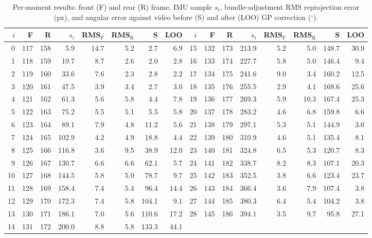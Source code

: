 \documentclass[11pt,a4paper]{article}
\newcommand{\dg}{^{\circ}}
\begin{document}
\begin{table}[H]\centering\footnotesize
\caption{Per-moment results: front (F) and rear (R) frame, IMU sample $s_i$, bundle-adjustment RMS
reprojection error (px), and angular error against video before (S) and after (LOO) GP
correction ($\dg$).}\label{tab:moments}
\setlength{\tabcolsep}{3.5pt}
\begin{tabular}{@{}rrrrrrrr|rrrrrrrr@{}}\toprule
$i$ & F & R & $s_i$ & RMS$_\mathrm F$ & RMS$_\mathrm R$ & S & LOO &
$i$ & F & R & $s_i$ & RMS$_\mathrm F$ & RMS$_\mathrm R$ & S & LOO\\\midrule
0 & 117 & 158 & 5.9 & 14.7 & 5.2 & 2.7 & 6.9 & 15 & 132 & 173 & 213.9 & 5.2 & 5.0 & 148.7 & 30.9\\
1 & 118 & 159 & 19.7 & 8.7 & 2.6 & 2.0 & 2.8 & 16 & 133 & 174 & 227.7 & 5.8 & 5.0 & 146.4 & 9.4\\
2 & 119 & 160 & 33.6 & 7.6 & 2.3 & 2.8 & 2.2 & 17 & 134 & 175 & 241.6 & 9.0 & 3.4 & 160.2 & 12.5\\
3 & 120 & 161 & 47.5 & 3.9 & 3.4 & 2.7 & 3.0 & 18 & 135 & 176 & 255.5 & 2.9 & 4.1 & 168.6 & 25.6\\
4 & 121 & 162 & 61.3 & 5.6 & 5.8 & 4.4 & 7.8 & 19 & 136 & 177 & 269.3 & 5.9 & 10.3 & 167.4 & 25.3\\
5 & 122 & 163 & 75.2 & 5.5 & 5.1 & 5.5 & 5.8 & 20 & 137 & 178 & 283.2 & 4.6 & 6.8 & 159.8 & 6.6\\
6 & 123 & 164 & 89.1 & 7.9 & 4.8 & 11.2 & 5.6 & 21 & 138 & 179 & 297.1 & 5.3 & 5.1 & 144.9 & 3.0\\
7 & 124 & 165 & 102.9 & 4.2 & 4.9 & 18.8 & 4.4 & 22 & 139 & 180 & 310.9 & 4.6 & 5.1 & 135.4 & 8.1\\
8 & 125 & 166 & 116.8 & 3.6 & 9.5 & 38.9 & 12.0 & 23 & 140 & 181 & 324.8 & 6.5 & 5.3 & 120.7 & 8.3\\
9 & 126 & 167 & 130.7 & 6.6 & 6.6 & 62.1 & 5.7 & 24 & 141 & 182 & 338.7 & 8.2 & 8.3 & 107.1 & 20.3\\
10 & 127 & 168 & 144.5 & 5.8 & 5.0 & 78.7 & 9.7 & 25 & 142 & 183 & 352.5 & 3.8 & 6.6 & 123.4 & 23.7\\
11 & 128 & 169 & 158.4 & 7.4 & 5.4 & 96.4 & 14.4 & 26 & 143 & 184 & 366.4 & 3.6 & 7.9 & 107.4 & 3.8\\
12 & 129 & 170 & 172.3 & 7.4 & 5.8 & 104.1 & 9.1 & 27 & 144 & 185 & 380.3 & 6.4 & 5.4 & 104.2 & 3.8\\
13 & 130 & 171 & 186.1 & 7.0 & 5.6 & 110.6 & 17.2 & 28 & 145 & 186 & 394.1 & 3.5 & 9.7 & 95.8 & 27.1\\
14 & 131 & 172 & 200.0 & 8.8 & 5.8 & 133.3 & 44.1 & & & & & & & & \\\bottomrule
\end{tabular}
\end{table}
\end{document}
